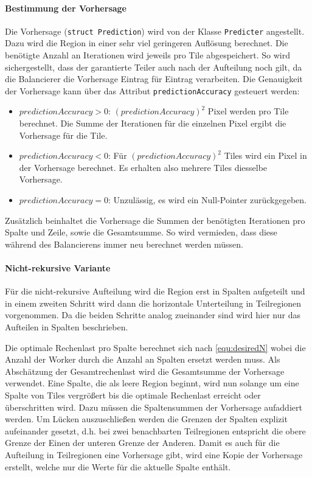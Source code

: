 \paragraph*{Bestimmung der Vorhersage}
Die Vorhersage (\verb|struct Prediction|) wird von der Klasse \verb|Predicter| angestellt.
Dazu wird die Region in einer sehr viel geringeren Auflösung berechnet.
Die benötigte Anzahl an Iterationen wird jeweils pro Tile abgespeichert.
So wird sichergestellt, dass der garantierte Teiler auch nach der Aufteilung noch gilt, da die Balancierer die Vorhersage Eintrag für Eintrag verarbeiten.
Die Genauigkeit der Vorhersage kann über das Attribut \verb|predictionAccuracy| gesteuert werden:
\begin{itemize}
	\item $predictionAccuracy > 0$: $(predictionAccuracy)^2$ Pixel werden pro Tile berechnet. Die Summe der Iterationen für die einzelnen Pixel ergibt die Vorhersage für die Tile.
	\item $predictionAccuracy < 0$: Für $(predictionAccuracy)^2$ Tiles wird ein Pixel in der Vorhersage berechnet. Es erhalten also mehrere Tiles diesselbe Vorhersage.
	\item $predictionAccuracy = 0$: Unzulässig, es wird ein Null-Pointer zurückgegeben.
\end{itemize}
Zusätzlich beinhaltet die Vorhersage die Summen der benötigten Iterationen pro Spalte und Zeile, sowie die Gesamtsumme.
So wird vermieden, dass diese während des Balancierens immer neu berechnet werden müssen.

\paragraph*{Nicht-rekursive Variante}\label{lastbalancierung_vorhersage}
Für die nicht-rekursive Aufteilung wird die Region erst in Spalten aufgeteilt und in einem zweiten Schritt wird dann die horizontale Unterteilung in Teilregionen vorgenommen.
Da die beiden Schritte analog zueinander sind wird hier nur das Aufteilen in Spalten beschrieben.

Die optimale Rechenlast pro Spalte berechnet sich nach \autoref{equ:desiredN} wobei die Anzahl der Worker durch die Anzahl an Spalten ersetzt werden muss.
Als Abschätzung der Gesamtrechenlast wird die Gesamtsumme der Vorhersage verwendet.
Eine Spalte, die als leere Region beginnt, wird nun solange um eine Spalte von Tiles vergrößert bis die optimale Rechenlast erreicht oder überschritten wird.
Dazu müssen die Spaltensummen der Vorhersage aufaddiert werden.
Um Lücken auszuschließen werden die Grenzen der Spalten explizit aufeinander gesetzt, d.h. bei zwei benachbarten Teilregionen entspricht die obere Grenze der Einen der unteren Grenze der Anderen.
Damit es auch für die Aufteilung in Teilregionen eine Vorhersage gibt, wird eine Kopie der Vorhersage erstellt, welche nur die Werte für die aktuelle Spalte enthält.

